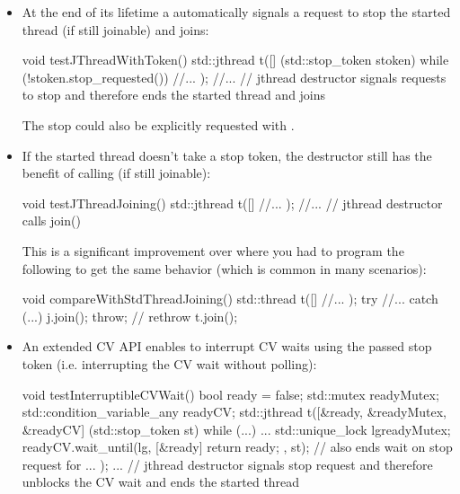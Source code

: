 \begin{itemize}
 \item At the end of its lifetime a  automatically signals a request to stop the started thread
        (if still joinable) and joins:
\begin{codeblock}
void testJThreadWithToken() 
{
    std::jthread t([] (std::stop_token stoken) {
                     while (!stoken.stop_requested()) {
                       //...
                     }
                   });
    //...
} // jthread destructor signals requests to stop and therefore ends the started thread and joins
\end{codeblock}

The stop could also be explicitly requested with .

 \item If the started thread doesn't take a stop token, 
        the destructor still has the benefit of calling  (if still joinable):
\begin{codeblock}
void testJThreadJoining()
{
    std::jthread t([] {
                     //...
                   });
    //...
} // jthread destructor calls join()
\end{codeblock}
        This is a significant improvement over  where you had to program the following
        to get the same behavior (which is common in many scenarios):
\begin{codeblock}
void compareWithStdThreadJoining()
{
    std::thread t([] {
                    //...
                  });
    try {
      //...
    }
    catch (...) {
      j.join();
      throw;  // rethrow
    }
    t.join();
}
\end{codeblock}

 \item An extended CV API enables to interrupt CV waits using the passed stop token
        (i.e. interrupting the CV wait without polling):
\begin{codeblock}
void testInterruptibleCVWait() 
{
  bool ready = false;
  std::mutex readyMutex;
  std::condition_variable_any readyCV;
  std::jthread t([&ready, &readyMutex, &readyCV] (std::stop_token st) {
                    while (...) {
                      ...
                      {
                        std::unique_lock lg{readyMutex};
                        readyCV.wait_until(lg,
                                           [&ready] {
                                              return ready;
                                           },
                                           st);  // also ends wait on stop request for 
                      }
                      ...
                    }
                  });
  ...
} // jthread destructor signals stop request and therefore unblocks the CV wait and ends the started thread
\end{codeblock}
\end{itemize}

